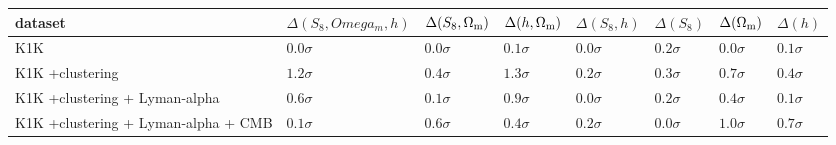 \documentclass{standalone}
\begin{document}
\begin{tabular}{llllllll}
\toprule
            dataset & $\Delta(S_8, Omega_m, h)$ & $\Delta(S_8,\Omega_{\rm m})$ & $\Delta(h,\Omega_{\rm m})$ & $\Delta(S_8,h)$ & $\Delta(S_8)$ & $\Delta(\Omega_{\rm m})$ &   $\Delta(h)$ \\
\midrule
             K1K &              $0.0 \sigma$ &                 $0.0 \sigma$ &               $0.1 \sigma$ &    $0.0 \sigma$ &  $0.2 \sigma$ &             $0.0 \sigma$ &  $0.1 \sigma$ \\
     K1K +clustering &              $1.2 \sigma$ &                 $0.4 \sigma$ &               $1.3 \sigma$ &    $0.2 \sigma$ &  $0.3 \sigma$ &             $0.7 \sigma$ &  $0.4 \sigma$ \\
 K1K +clustering + Lyman-alpha &              $0.6 \sigma$ &                 $0.1 \sigma$ &               $0.9 \sigma$ &    $0.0 \sigma$ &  $0.2 \sigma$ &             $0.4 \sigma$ &  $0.1 \sigma$ \\
          K1K +clustering + Lyman-alpha + CMB&              $0.1 \sigma$ &                 $0.6 \sigma$ &               $0.4 \sigma$ &    $0.2 \sigma$ &  $0.0 \sigma$ &             $1.0 \sigma$ &  $0.7 \sigma$ \\
\bottomrule
\end{tabular}
\end{document}
